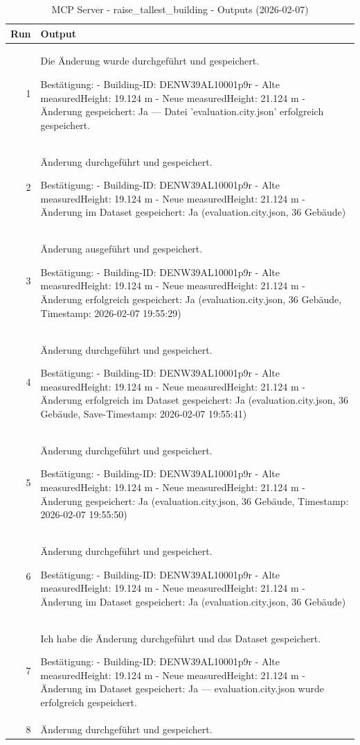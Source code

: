 \documentclass[a4paper,11pt]{article}
\begin{document}
\begin{table}[ht]
\centering
\scriptsize
\caption{MCP Server - raise\_tallest\_building - Outputs (2026-02-07)}
\label{tab:mcp\_raise\_tallest\_building\_outputs\_2026-02-07}
\begin{tabular}{r p{12cm}}
\hline
Run & Output \\
\hline
1 & Die Änderung wurde durchgeführt und gespeichert.

Bestätigung:
- Building-ID: DENW39AL10001p9r
- Alte measuredHeight: 19.124 m
- Neue measuredHeight: 21.124 m
- Änderung gespeichert: Ja — Datei 'evaluation.city.json' erfolgreich gespeichert. \\
2 & Änderung durchgeführt und gespeichert.

Bestätigung:
- Building-ID: DENW39AL10001p9r
- Alte measuredHeight: 19.124 m
- Neue measuredHeight: 21.124 m
- Änderung im Dataset gespeichert: Ja (evaluation.city.json, 36 Gebäude) \\
3 & Änderung ausgeführt und gespeichert.

Bestätigung:
- Building-ID: DENW39AL10001p9r
- Alte measuredHeight: 19.124 m
- Neue measuredHeight: 21.124 m
- Änderung erfolgreich gespeichert: Ja (evaluation.city.json, 36 Gebäude, Timestamp: 2026-02-07 19:55:29) \\
4 & Änderung durchgeführt und gespeichert.

Bestätigung:
- Building-ID: DENW39AL10001p9r
- Alte measuredHeight: 19.124 m
- Neue measuredHeight: 21.124 m
- Änderung erfolgreich im Dataset gespeichert: Ja (evaluation.city.json, 36 Gebäude, Save-Timestamp: 2026-02-07 19:55:41) \\
5 & Änderung durchgeführt und gespeichert.

Bestätigung:
- Building-ID: DENW39AL10001p9r
- Alte measuredHeight: 19.124 m
- Neue measuredHeight: 21.124 m
- Änderung gespeichert: Ja (evaluation.city.json, 36 Gebäude, Timestamp: 2026-02-07 19:55:50) \\
6 & Änderung durchgeführt und gespeichert.

Bestätigung:
- Building-ID: DENW39AL10001p9r
- Alte measuredHeight: 19.124 m
- Neue measuredHeight: 21.124 m
- Änderung im Dataset gespeichert: Ja (evaluation.city.json, 36 Gebäude) \\
7 & Ich habe die Änderung durchgeführt und das Dataset gespeichert.

Bestätigung:
- Building-ID: DENW39AL10001p9r
- Alte measuredHeight: 19.124 m
- Neue measuredHeight: 21.124 m
- Änderung im Dataset gespeichert: Ja — evaluation.city.json wurde erfolgreich gespeichert. \\
8 & Änderung durchgeführt und gespeichert.


\end{tabular}
\end{table}
\end{document}

